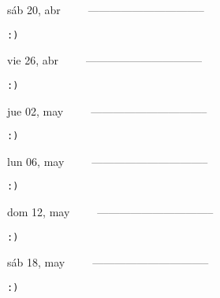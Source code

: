 \documentclass[letterpaper,10pt]{article}
\begin{document}
\begin{multicols}{3}
{sáb 20, abr\ \ \ \ \ --------------------------------}
\begin{flushright}\begin{small}\texttt{:)}\end{small}\end{flushright}
\vfill
{vie 26, abr\ \ \ \ \ --------------------------------}
\begin{flushright}\begin{small}\texttt{:)}\end{small}\end{flushright}\par
\vfill
{jue 02, may\ \ \ \ \ --------------------------------}
\begin{flushright}\begin{small}\texttt{:)}\end{small}\end{flushright}\par
\vfill
\end{multicols}
\vspace{1.05cm}

\begin{multicols}{3}
{lun 06, may\ \ \ \ \ --------------------------------}
\begin{flushright}\begin{small}\texttt{:)}\end{small}\end{flushright}
\vfill
{dom 12, may\ \ \ \ \ --------------------------------}
\begin{flushright}\begin{small}\texttt{:)}\end{small}\end{flushright}\par
\vfill
{sáb 18, may\ \ \ \ \ --------------------------------}
\begin{flushright}\begin{small}\texttt{:)}\end{small}\end{flushright}\par
\vfill
\end{multicols}
\vspace{1.05cm}
\end{document}
